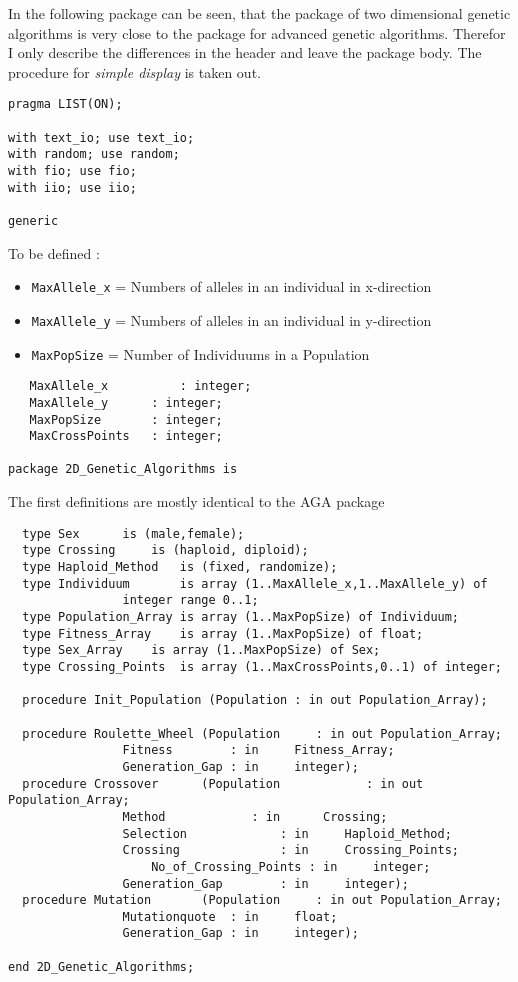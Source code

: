 In the following package can be seen, that the package of two dimensional genetic
algorithms is very close to the package for advanced genetic algorithms. Therefor
I only describe the differences in the header and leave the package body. The
procedure for {\it simple display} is taken out.
\begin{verbatim}
pragma LIST(ON);

with text_io; use text_io;
with random; use random;
with fio; use fio;
with iio; use iio;

generic
\end{verbatim}
To be defined :
\begin{itemize}
\item {\tt MaxAllele\_x} = Numbers of alleles in an individual in x-direction
\item {\tt MaxAllele\_y} = Numbers of alleles in an individual in y-direction
\item {\tt MaxPopSize} = Number of Individuums in a Population
\end{itemize}
\begin{verbatim}
   MaxAllele_x	    	: integer;
   MaxAllele_y		: integer;
   MaxPopSize		: integer;
   MaxCrossPoints	: integer;

package 2D_Genetic_Algorithms is
\end{verbatim}
The first definitions are mostly identical to the AGA package
\begin{verbatim}
  type Sex		is (male,female);
  type Crossing		is (haploid, diploid);
  type Haploid_Method   is (fixed, randomize);
  type Individuum       is array (1..MaxAllele_x,1..MaxAllele_y) of 
				integer range 0..1;
  type Population_Array is array (1..MaxPopSize) of Individuum;
  type Fitness_Array    is array (1..MaxPopSize) of float;
  type Sex_Array	is array (1..MaxPopSize) of Sex;
  type Crossing_Points	is array (1..MaxCrossPoints,0..1) of integer;

  procedure Init_Population (Population : in out Population_Array);

  procedure Roulette_Wheel (Population     : in out Population_Array;
			    Fitness        : in     Fitness_Array;
			    Generation_Gap : in     integer);
  procedure Crossover      (Population            : in out Population_Array;
			    Method	          : in	    Crossing;
			    Selection             : in     Haploid_Method;
			    Crossing              : in     Crossing_Points;
		            No_of_Crossing_Points : in     integer;
			    Generation_Gap        : in     integer);
  procedure Mutation       (Population     : in out Population_Array;
			    Mutationquote  : in     float;
			    Generation_Gap : in     integer);

end 2D_Genetic_Algorithms;
\end{verbatim}
